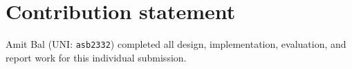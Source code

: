 \documentclass[11pt]{article}
\begin{document}
\section*{Contribution statement}
Amit Bal (UNI: \texttt{asb2332}) completed all design, implementation, evaluation, and report work for this individual submission.
\end{document}

